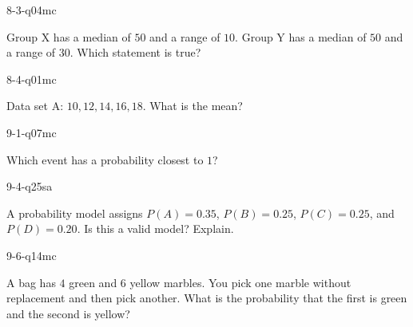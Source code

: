\begin{practiceQuestion}{8-3-q04}{mc}
\begin{questionText}
Group X has a median of $50$ and a range of $10$. Group Y has a median of $50$ and a range of $30$. Which statement is true?
\end{questionText}
\end{practiceQuestion}

\begin{practiceQuestion}{8-4-q01}{mc}
\begin{questionText}
Data set A: $10, 12, 14, 16, 18$. What is the mean?
\end{questionText}
\end{practiceQuestion}

\begin{practiceQuestion}{9-1-q07}{mc}
\begin{questionText}
Which event has a probability closest to $1$?
\end{questionText}
\end{practiceQuestion}

\begin{practiceQuestion}{9-4-q25}{sa}
\begin{questionText}
A probability model assigns $P(A) = 0.35$, $P(B) = 0.25$, $P(C) = 0.25$, and $P(D) = 0.20$. Is this a valid model? Explain.
\end{questionText}
\end{practiceQuestion}

\begin{practiceQuestion}{9-6-q14}{mc}
\begin{questionText}
A bag has $4$ green and $6$ yellow marbles. You pick one marble without replacement and then pick another. What is the probability that the first is green and the second is yellow?
\end{questionText}
\end{practiceQuestion}

